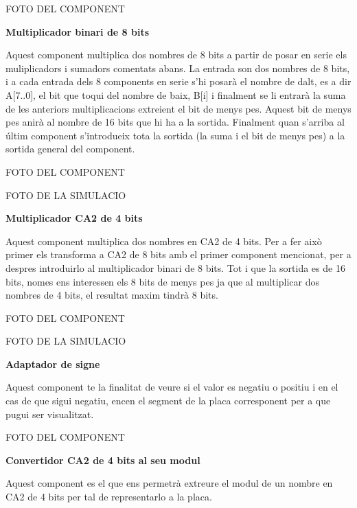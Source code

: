 \documentclass[12pt, a4papre]{article}
\begin{document}
	\begin{center}
	FOTO DEL COMPONENT
	\end{center}
	
	\textbf{\large{Multiplicador binari de 8 bits}}
	
	Aquest component multiplica dos nombres de 8 bits a partir de posar en serie els muliplicadors i sumadors comentats abans. La entrada son dos nombres de 8 bits, i a cada entrada dels 8 components en serie s'hi posarà el nombre de dalt, es a dir A[7..0], el bit que toqui del nombre de baix, B[i] i finalment se li entrarà la suma de les anteriors multiplicacions extreient el bit de menys pes. Aquest bit de menys pes anirà al nombre de 16 bits que hi ha a la sortida. Finalment quan s'arriba al últim component s'introdueix tota la sortida (la suma i el bit de menys pes) a la sortida general del component.
	
	\begin{center}
	FOTO DEL COMPONENT
	
	FOTO DE LA SIMULACIO
	\end{center}
	
	\textbf{\large{Multiplicador CA2 de 4 bits}}
	
	Aquest component multiplica dos nombres en CA2 de 4 bits. Per a fer això primer els transforma a CA2 de 8 bits amb el primer component mencionat, per a despres introduirlo al multiplicador binari de 8 bits. Tot i que la sortida es de 16 bits, nomes ens interessen els 8 bits de menys pes ja que al multiplicar dos nombres de 4 bits, el resultat maxim tindrà 8 bits.
	
	\begin{center}
	FOTO DEL COMPONENT
	
	FOTO DE LA SIMULACIO
	\end{center}
	
	\textbf{\large{Adaptador de signe}}
	
	Aquest component te la finalitat de veure si el valor es negatiu o positiu i en el cas de que sigui negatiu, encen el segment de la placa corresponent per a que pugui ser visualitzat.
	
	\begin{center}
	FOTO DEL COMPONENT
	\end{center}
	
	\textbf{\large{Convertidor CA2 de 4 bits al seu modul}}
	
	Aquest component es el que ens permetrà extreure el modul de un nombre en CA2 de 4 bits per tal de representarlo a la placa.
	
\end{document}
